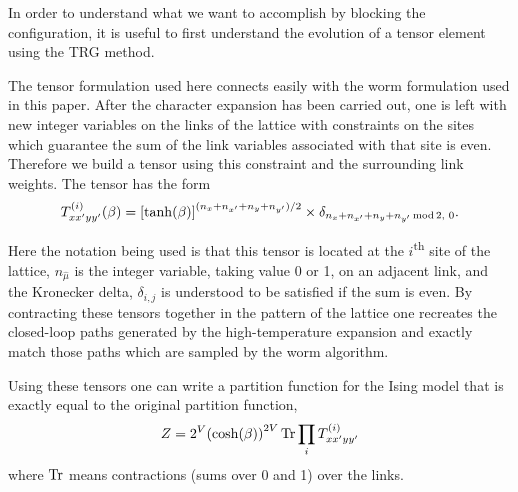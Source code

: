 \documentclass[../main.tex]{subfiles}
\begin{document}
In order to understand what we want to accomplish by blocking the \lc
configuration, it is useful to first understand the evolution of a tensor
element using the TRG method. 

The tensor formulation used here connects easily with  the worm formulation
used in this paper.
%
After the character expansion has been carried out, one is left with new
integer variables on the links of the lattice with constraints on the sites
which guarantee the sum of the link variables associated with that site is
even.
%
Therefore we build a tensor using this constraint and the surrounding link
weights.
%
The tensor has the form
%
\begin{equation}
    T^{(i)}_{x{x^{\prime}} y{y^{\prime}}}(\beta) = 
    {\left[\tanh(\beta)\right]}^{(n_{x}+n_{{x^{\prime}}}+n_{y}+n_{{y^{\prime}}})/2}
    \times \delta_{n_{x}+n_{{x^{\prime}}}+n_{y}+n_{{y^{\prime}}}\,\mathrm{mod}\,2,\,\,0}.
\end{equation}

Here the notation being used is that this tensor is located at the
$i$\textsuperscript{th} site of the lattice, $n_{\hat{\mu}}$ is the integer
variable, taking value 0 or 1, on an adjacent link, and the Kronecker delta,
$\delta_{i,j}$ is understood to be satisfied if the sum is even.
%
By contracting these tensors together in the pattern of the lattice one
recreates the closed-loop paths generated by the high-temperature expansion and
exactly match those paths which are sampled by the worm algorithm.

Using these tensors one can write a partition function for the Ising model that
is exactly equal to the original partition function,
%
\begin{equation}
 Z =2^V {(\cosh (\beta))}^{2V}\operatorname{Tr} \prod_{i}T^{(i)}_{x{x^{\prime}} y{y^{\prime}}} 
\end{equation} 
%
where $\operatorname{Tr}$ means contractions (sums over 0 and 1) over the links. 
\end{document}
